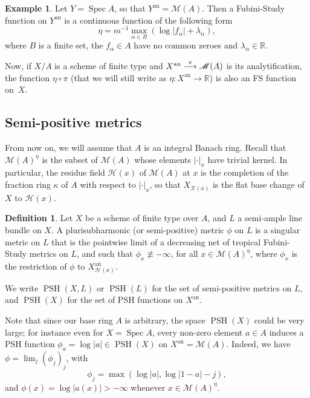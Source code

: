 \documentclass[JEP,XML,SOM,Unicode,published]{cedram}
\newcommand{\To}[1]{\mathchoice{\xrightarrow{\textstyle\kern4pt#1\kern3pt}}{\stackrel{#1}{\longrightarrow}}{}{}}
\theoremstyle{definition}
\newtheorem{defn}[equation]{Definition}
\newtheorem{ex}[equation]{Example}
\newcommand \R{\mathbb R}
\newcommand \M {\mathscr {M}}
\newcommand{\an}{\mathrm{an}}
\DeclareMathOperator{\PSH}{PSH}
\DeclareMathOperator{\Sp}{Spec}
\begin{document}
\begin{ex}
Let $Y = \Sp A$, so that $Y^{\an} =\mathscr{M}(A)$. Then a Fubini-Study function on $Y^{\an}$ is a continuous function of the following form
\[
\eta =m^{-1} \max_{\alpha \in B} (\log \lvert f_{\alpha} \rvert + \lambda_{\alpha}),
\]
where $B$ is a finite set, the $f_{\alpha} \in A$ have no common zeroes and $\lambda_{\alpha} \in \R$.

Now, if $X/A$ is a scheme of finite type and $X^{\an} \To{\pi} \mathscr{M}(A)$ is its analytification, the function $\eta \circ \pi$ (that we will still write as $\eta: X^{\an} \to \R$) is also an FS function on~$X$.
\end{ex}
\subsection{Semi-positive metrics}
From now on, we will assume that $A$ is an integral Banach ring. Recall that $\M(A)^{\eta}$ is the subset of $\M(A)$ whose elements $\lvert \cdot \rvert_x$ have trivial kernel. In particular, the residue field $\mathscr{H}(x)$ of $\M(A)$ at $x$ is the completion of the fraction ring $\kappa$ of $A$ with respect to $\lvert \cdot \rvert_x$, so that $X_{\mathscr{X}(x)}$ is the flat base change of $X$ to $\mathscr{H}(x)$.
\begin{defn}
Let $X$ be a scheme of finite type over $A$, and $L$ a semi-ample line bundle on $X$. A plurisubharmonic (or semi-positive) metric $\phi$ on $L$ is a singular metric on $L$ that is the pointwise limit of a decreasing net of tropical Fubini-Study metrics on $L$, and such that $ \phi_x \not\equiv - \infty$, for all $x \in \M(A)^{\eta}$, where $\phi_x$ is the restriction of $\phi$ to $X_{\mathscr{H}(x)}^{\an}$.

We write $\PSH(X, L)$ or $\PSH(L)$ for the set of semi-positive metrics on $L$, and $\PSH(X)$ for the set of PSH functions on $X^{\an}$.
\end{defn}
Note that since our base ring $A$ is arbitrary, the space $\PSH(X)$ could be very large; for instance even for $X = \Sp A$, every non-zero element $a \in A$ induces a PSH function $\phi_a = \log \lvert a \rvert \in \PSH(X)$ on $X^{\an} = \mathscr{M}(A)$. Indeed, we have $\phi = \lim_j (\phi_j)_j$, with
\[
\phi_j = \max(\log \lvert a \rvert , \log \lvert 1-a \rvert -j),
\]
and $\phi(x) = \log \lvert a(x) \rvert > - \infty$ whenever $x \in \M(A)^{\eta}$.
\end{document}

